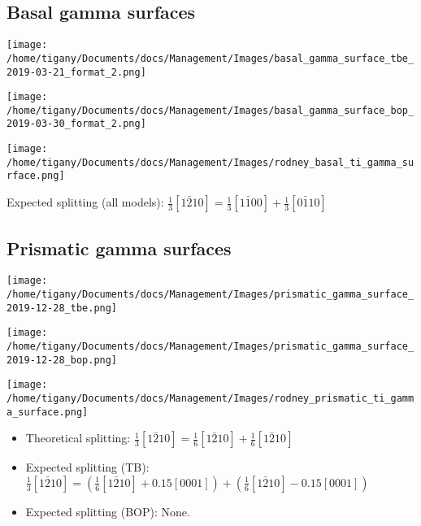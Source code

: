 \documentclass[11pt]{article}
\begin{document}
\subsection*{Basal gamma surfaces}
\label{sec:org85d07be}


\begin{center}
\texttt{[image: /home/tigany/Documents/docs/Management/Images/basal\_gamma\_surface\_tbe\_2019-03-21\_format\_2.png]}
\label{orgc5c8da3}
\end{center}


\begin{center}
\texttt{[image: /home/tigany/Documents/docs/Management/Images/basal\_gamma\_surface\_bop\_2019-03-30\_format\_2.png]}
\end{center}


\begin{center}
\texttt{[image: /home/tigany/Documents/docs/Management/Images/rodney\_basal\_ti\_gamma\_surface.png]}
\end{center}

Expected splitting (all models): \(\frac{1}{3}[1\bar{2}10] = \frac{1}{3}[1\bar{1}00] +  \frac{1}{3}[0\bar{1}10]\)

\subsection*{Prismatic gamma surfaces}
\label{sec:org9d4a1f2}

\begin{center}
\texttt{[image: /home/tigany/Documents/docs/Management/Images/prismatic\_gamma\_surface\_2019-12-28\_tbe.png]}
\end{center}


\begin{center}
\texttt{[image: /home/tigany/Documents/docs/Management/Images/prismatic\_gamma\_surface\_2019-12-28\_bop.png]}
\end{center}



\begin{center}
\texttt{[image: /home/tigany/Documents/docs/Management/Images/rodney\_prismatic\_ti\_gamma\_surface.png]}
\end{center}


\begin{itemize}
\item Theoretical splitting: \(\frac{1}{3}[1\bar{2}10] = \frac{1}{6}[1\bar{2}10] + \frac{1}{6}[1\bar{2}10]\)
\item Expected splitting (TB): \(\frac{1}{3}[1\bar{2}10] = ( \frac{1}{6}[1\bar{2}10] + 0.15[0001]) + ( \frac{1}{6}[1\bar{2}10] - 0.15[0001] )\)
\item Expected splitting (BOP): None.
\end{itemize}
\end{document}
